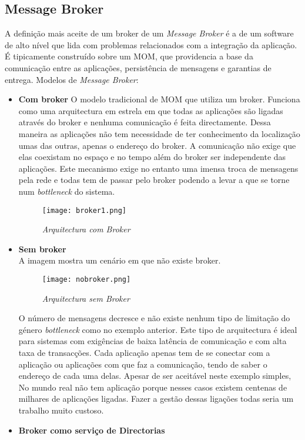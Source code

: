 \subsection{Message Broker}
A definição mais aceite de um broker de um \textit{Message Broker} é a de um software de alto nível que lida com problemas relacionados com a integração da aplicação. É tipicamente construído sobre um MOM, que providencia a base da comunicação entre as aplicações, persistência de mensagens e garantias de entrega. Modelos de \textit{Message Broker}:
\begin{itemize}
\item \textbf{Com broker} O modelo tradicional de MOM que utiliza um broker. Funciona como uma arquitectura em estrela em que todas as aplicações são ligadas através do broker e nenhuma comunicação é feita directamente. Dessa maneira as aplicações não tem necessidade de ter conhecimento da localização umas das outras, apenas o endereço do broker. A comunicação não exige que elas coexistam no espaço e no tempo além do broker ser independente das aplicações. Este mecanismo exige no entanto uma imensa troca de mensagens pela rede e todas tem de passar pelo broker podendo a levar a que se torne num \textit{bottleneck} do sistema.
\begin{figure}[H]
\centering
\texttt{[image: broker1.png]}
\caption{\textit{Arquitectura com Broker}}
\label{fig:broker}
\end{figure}
\item \textbf{Sem broker}\\
A imagem mostra um cenário em que não existe broker.
\begin{figure}[H]
\centering
\texttt{[image: nobroker.png]}
\caption{\textit{Arquitectura sem Broker}}
\label{fig:nobroker}
\end{figure}
O número de mensagens decresce e não existe nenhum tipo de limitação do género \textit{bottleneck} como no exemplo anterior. Este tipo de arquitectura é ideal para sistemas com exigências de baixa latência de comunicação e com alta taxa de transacções. Cada aplicação apenas tem de se conectar com a aplicação ou aplicações com que faz a comunicação, tendo de saber o endereço de cada uma delas. Apesar de ser aceitável neste exemplo simples,  No  mundo real não tem aplicação porque nesses casos existem centenas de milhares de aplicações ligadas. Fazer a gestão dessas ligações todas seria um trabalho muito custoso.\\
\item \textbf{Broker como serviço de Directorias} \\

\end{itemize}
